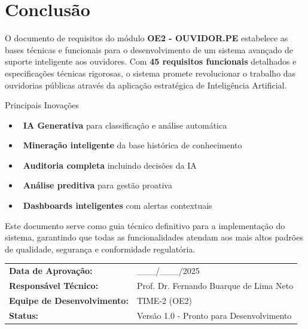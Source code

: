 \documentclass[12pt,a4paper]{article}
\begin{document}
\section{Conclusão}

O documento de requisitos do módulo \textbf{OE2 - OUVIDOR.PE} estabelece as bases técnicas e funcionais para o desenvolvimento de um sistema avançado de suporte inteligente aos ouvidores. Com \textbf{45 requisitos funcionais} detalhados e especificações técnicas rigorosas, o sistema promete revolucionar o trabalho das ouvidorias públicas através da aplicação estratégica de Inteligência Artificial.

\begin{highlightbox}{Principais Inovações}
\begin{itemize}
    \item \textbullet~\textbf{IA Generativa} para classificação e análise automática
    \item \textbullet~\textbf{Mineração inteligente} da base histórica de conhecimento
    \item \textbullet~\textbf{Auditoria completa} incluindo decisões da IA
    \item \textbullet~\textbf{Análise preditiva} para gestão proativa
    \item \textbullet~\textbf{Dashboards inteligentes} com alertas contextuais
\end{itemize}
\end{highlightbox}

Este documento serve como guia técnico definitivo para a implementação do sistema, garantindo que todas as funcionalidades atendam aos mais altos padrões de qualidade, segurança e conformidade regulatória.

\vfill

\begin{center}
\begin{tcolorbox}[
    colback=primaryblue!10,
    colframe=primaryblue,
    center title,
    fonttitle=\bfseries,
    title=APROVAÇÃO
]
\begin{tabular}{@{}ll@{}}
\textbf{Data de Aprovação:} & \_\_\_/\_\_\_/2025 \\
\textbf{Responsável Técnico:} & Prof. Dr. Fernando Buarque de Lima Neto \\
\textbf{Equipe de Desenvolvimento:} & TIME-2 (OE2) \\
\textbf{Status:} & Versão 1.0 - Pronto para Desenvolvimento \\
\end{tabular}
\end{tcolorbox}
\end{center}
\end{document}
